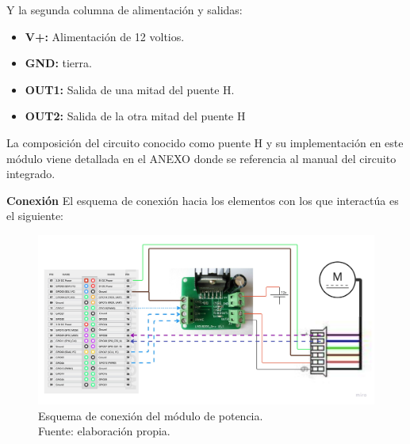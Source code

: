 Y la segunda columna de alimentación y salidas:

\begin{itemize}
	\item \textbf{V+:} Alimentación de 12 voltios.
	\item \textbf{GND:} tierra.
	\item \textbf{OUT1:} Salida de una mitad del puente H.
	\item \textbf{OUT2:} Salida de la otra mitad del puente H
\end{itemize}

La composición del circuito conocido como puente H y su implementación en este módulo viene detallada en el ANEXO donde se referencia al manual del circuito integrado.

		\textbf{Conexión}
El esquema de conexión hacia los elementos con los que interactúa es el siguiente:
\begin{figure}[H]
		\centering
		\includegraphics[scale = 0.15]{part/Proyecto_ejecutivo/memoria_constructiva/motor/img/connection diagram}
		\caption[Esquema de conexión del módulo de potencia.]{Esquema de conexión del módulo de potencia.\\Fuente: elaboración propia.}\label{fig:figure2}
\end{figure}